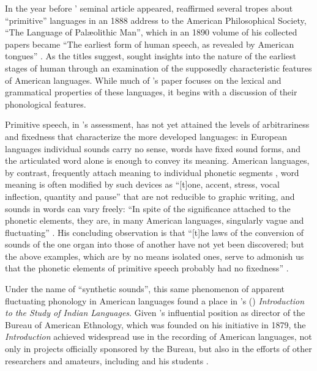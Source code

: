 \documentclass[output=paper]{langscibook}
\begin{document}
In the year before {\Boas}' seminal article appeared, {\Brinton} reaffirmed several tropes about ``primitive'' languages in an 1888 address to the American Philosophical Society, ``The Language of Palæolithic Man'', which in an 1890 volume of his collected papers became ``The earliest form of human speech, as revealed by American tongues'' \citep{Brinton18901888}. As the titles suggest, {\Brinton} sought insights into the nature of the earliest stages of human  through an examination of the supposedly characteristic features of American languages. While much of {\Brinton}'s paper focuses on the lexical and grammatical properties of these languages, it begins with a discussion of their phonological features.

Primitive speech, in {\Brinton}'s assessment, has not yet attained the levels of arbitrariness and fixedness that characterize the more developed languages: in European languages individual sounds carry no sense, words have fixed sound forms, and the articulated word alone is enough to convey its meaning. American languages, by contrast, frequently attach meaning to individual phonetic segments \citep[394]{Brinton18901888}, word meaning is often modified by such devices as ``[t]one, accent, stress, vocal inflection, quantity and pause'' \citep[399]{Brinton18901888} that are not reducible to graphic writing, and sounds in words can vary freely: ``In spite of the significance attached to the phonetic elements, they are, in many American languages, singularly vague and fluctuating'' \citep[397]{Brinton18901888}. His concluding observation is that ``[t]he laws of the conversion of sounds of the one organ into those of another have not yet been discovered; but the above examples, which are by no means isolated ones, serve to admonish us that the phonetic elements of primitive speech probably had no fixedness'' \citep[398--399]{Brinton18901888}.

Under the name of ``synthetic sounds'', this same phenomenon of apparent fluctuating phonology in American languages found a place in {\Powell}'s (\citeyear{Powell18801877}) \emph{Introduction to the Study of Indian Languages}. Given {\Powell}'s influential position as director of the Bureau of American Ethnology, which was founded on his initiative in 1879, the \emph{Introduction} achieved widespread use in the recording of American languages, not only in projects officially sponsored by the Bureau, but also in the efforts of other researchers and amateurs, including {\Boas} and his students \citep[see][50--51]{Darnell1998}.
\end{document}
